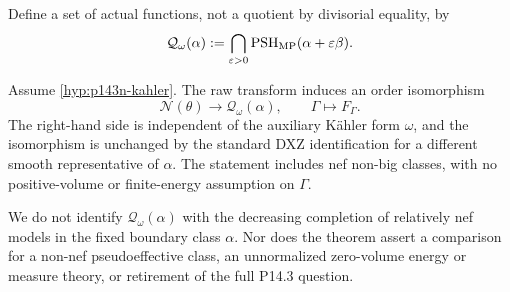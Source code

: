 Define a set of actual functions, not a quotient by divisorial equality,
by
\begin{equation}\label{eq:p143n-intersection}
 \mathcal Q_\omega(\alpha)
 :=\bigcap_{\varepsilon>0}
 \operatorname{PSH}_{\mathrm{MP}}(\alpha+\varepsilon\beta).
\end{equation}

\begin{theorem}\label{thm:p143n-nef}
Assume \cref{hyp:p143n-kahler}. The raw transform induces an order
isomorphism
\[
 \mathcal N(\theta)\longrightarrow\mathcal Q_\omega(\alpha),
 \qquad \Gamma\longmapsto F_\Gamma.
\]
The right-hand side is independent of the auxiliary K\"ahler form
\(\omega\), and the isomorphism is unchanged by the standard DXZ
identification for a different smooth representative of \(\alpha\).
The statement includes nef non-big classes, with no positive-volume or
finite-energy assumption on \(\Gamma\).
\end{theorem}

We do not identify \(\mathcal Q_\omega(\alpha)\) with the decreasing
completion of relatively nef models in the fixed boundary class
\(\alpha\). Nor does the theorem assert a comparison for a non-nef
pseudoeffective class, an unnormalized zero-volume energy or measure
theory, or retirement of the full P14.3 question.
